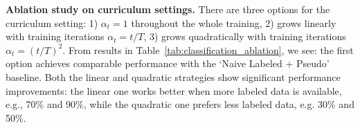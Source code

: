\begin{table}[!htbp]
\footnotesize
\centering
\caption{Ablation study on different curriculum settings on ImageNet-100. All models are trained in 20 epochs.}
\setlength{\tabcolsep}{8pt}
\renewcommand\arraystretch{1.2}
    \label{tab:classification_ablation}
\end{table}


\noindent \textbf{Ablation study on curriculum settings.}
There are three options for the curriculum setting: 
1) $\alpha_t=1$ throughout the whole training,
2) grows linearly with training iterations $\alpha_t=t/T$,
3) grows quadratically with training iterations $\alpha_t=(t/T)^2$.
From results in Table~\ref{tab:classification_ablation}, we see:
the first option achieves comparable performance with the `Naive Labeled + Pseudo' baseline.
Both the linear and quadratic strategies show significant performance improvements: the linear one works better when more labeled data is available, e.g., 70\% and 90\%, while the quadratic one prefers less labeled data, e.g. 30\% and 50\%.


